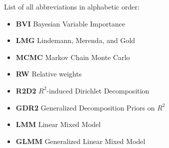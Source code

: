 
List of all abbreviations in alphabetic order:

\begin{itemize}
    \item \textbf{BVI} Bayesian Variable Importance
    \item \textbf{LMG} Lindemann, Merenda, and Gold
    \item \textbf{MCMC} Markov Chain Monte Carlo
    \item \textbf{RW} Relative weights
    \item \textbf{R2D2} $R^2$-induced Dirichlet Decomposition
    \item \textbf{GDR2} Generalized Decomposition Priors on $R^2$
    \item \textbf{LMM} Linear Mixed Model
    \item \textbf{GLMM} Generalized Linear Mixed Model
\end{itemize}